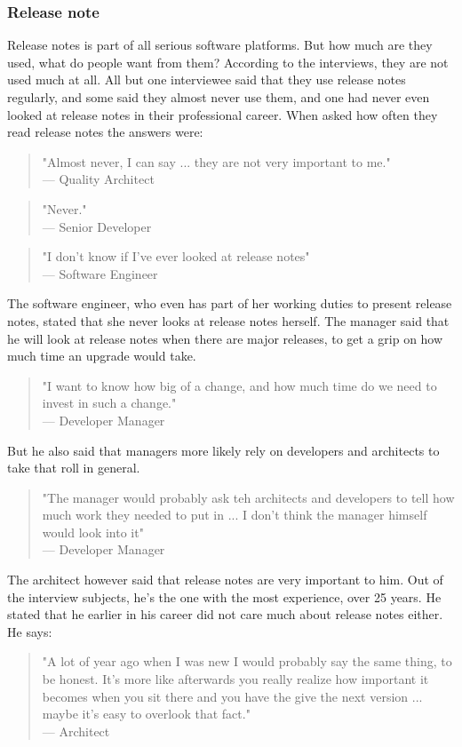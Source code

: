 \documentclass{article}
\begin{document}
\subsubsection{Release note}
Release notes is part of all serious software platforms. But how much are they used, what do people want from them? According to the interviews, they are not used much at all. All but one interviewee said that they use release notes regularly, and some said they almost never use them, and one had never even looked at release notes in their professional career. When asked how often they read release notes the answers were:
\begin{quote}
"Almost never, I can say ... they are not very important to me."\\
--- Quality Architect
\end{quote}
\begin{quote}
"Never." \\
--- Senior Developer
\end{quote}
\begin{quote}
"I don't know if I've ever looked at release notes" \\
--- Software Engineer
\end{quote}
The software engineer, who even has part of her working duties to present release notes, stated that she never looks at release notes herself.
The manager said that he will look at release notes when there are major releases, to get a grip on how much time an upgrade would take.
\begin{quote}
"I want to know how big of a change, and how much time do we need to invest in such a change."\\
--- Developer Manager
\end{quote}
But he also said that managers more likely rely on developers and architects to take that roll in general.
\begin{quote}
"The manager would probably ask teh architects and developers to tell how much work they needed to put in ... I don't think the manager himself would look into it"\\
--- Developer Manager
\end{quote}
The architect however said that release notes are very important to him. Out of the interview subjects, he's the one with the most experience, over 25 years. He stated that he earlier in his career did not care much about release notes either. He says:
\begin{quote}
"A lot of year ago when I was new I would probably say the same thing, to be honest. It's more like afterwards you really realize how important it becomes when you sit there and you have the give the next version ... maybe it's easy to overlook that fact."\\
--- Architect
\end{quote}
\end{document}
